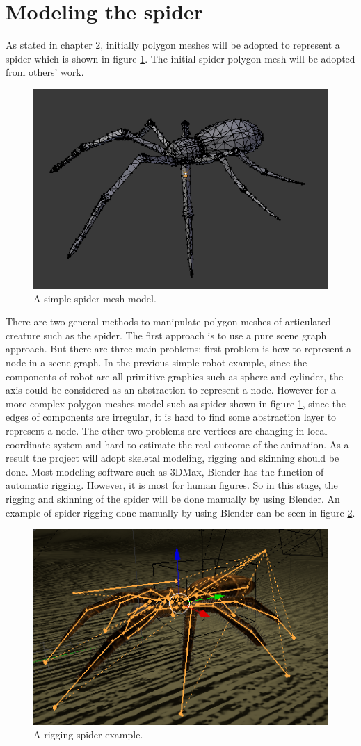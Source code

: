 \section{Modeling the spider}
As stated in chapter 2, initially polygon meshes will be adopted to represent a spider which is shown in figure \ref{fig:spiderMesh}. The initial spider polygon mesh will be adopted from others' work.
\begin{figure}[ht!]
\centering
\includegraphics[height=6 cm]{figures/spiderMesh.png}
\caption{A simple spider mesh model. \protect\cite{spiderMesh}}
\label{fig:spiderMesh}
\end{figure}
There are two general methods to manipulate polygon meshes of articulated creature such as the spider. The first approach is to use a pure scene graph approach. But there are three main problems: first problem is how to represent a node in a scene graph. In the previous simple robot example, since the components of robot are all primitive graphics such as sphere and cylinder, the axis could be considered as an abstraction to represent a node. However for a more complex polygon meshes model such as spider shown in figure \ref{fig:spiderMesh}, since the edges of components are irregular, it is hard to find some abstraction layer to represent a node. The other two problems are vertices are changing in local coordinate system and hard to estimate the real outcome of the animation. As a result the project will adopt skeletal modeling, rigging and skinning should be done. 
Most modeling software such as 3DMax, Blender has the function of automatic rigging. However, it is most for human figures. So in this stage, the rigging and skinning of the spider will be done manually by using Blender. An example of spider rigging done manually by using Blender can be seen in figure \ref{fig:spiderRigging}.
 \begin{figure}[ht!]
\centering
\includegraphics[height=6 cm]{figures/spiderRigging.png}
\caption{A rigging spider example. \protect\cite{spiderModel}}
\label{fig:spiderRigging}
\end{figure}
